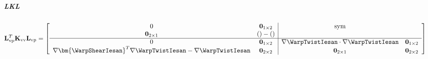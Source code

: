 
\subparagraph{LKL}
\begin{equation}
\mathbf{L}_{\rm vp}^T\mathbf{K}_{\rm vv}\mathbf{L}_{\rm vp} = \left[\begin{array}{cc|cc}
0 & \mathbf{0}_{1\times2} & \mathrm{sym} 
\\
\mathbf{0}_{2\times1} 
& () - () &  
\\ \hline 
0 & \mathbf{0}_{1\times 2} & \nabla\WarpTwistIesan\cdot\nabla\WarpTwistIesan & \mathbf{0}_{1\times 2}
\\
\nabla\bm{\WarpShearIesan}^T\nabla\WarpTwistIesan - \nabla\WarpTwistIesan
& \mathbf{0}_{2\times2} & \mathbf{0}_{2\times 1}& \mathbf{0}_{2\times 2}
\end{array}\right]
\label{eq:LvpKvvLvp}
\end{equation}


